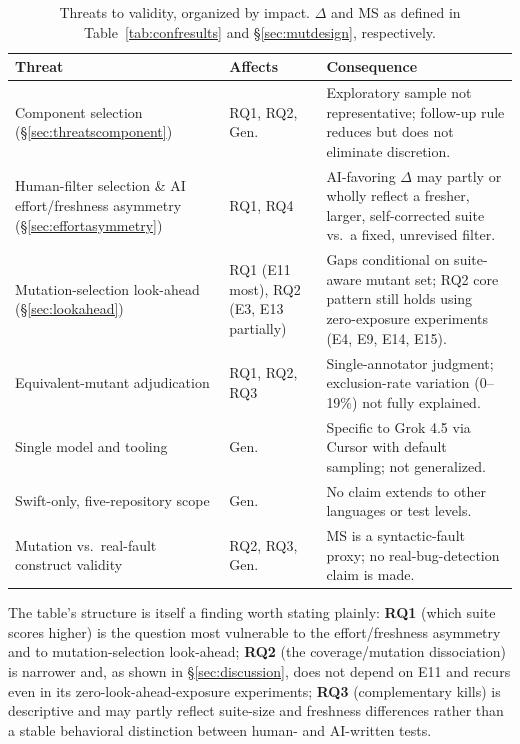 \documentclass[10pt,conference]{IEEEtran}
\begin{document}
\begin{table}[ht]
\centering
\caption{Threats to validity, organized by impact. $\Delta$ and MS as defined in Table~\ref{tab:confresults} and \S\ref{sec:mutdesign}, respectively.}
\label{tab:threatsimpact}
\small
\begin{tabular}{p{2.3cm}p{1.3cm}p{3.6cm}}
\toprule
Threat & Affects & Consequence \\
\midrule
Component selection (\S\ref{sec:threatscomponent}) & RQ1, RQ2, Gen. & Exploratory sample not representative; follow-up rule reduces but does not eliminate discretion. \\
Human-filter selection \& AI effort/freshness asymmetry (\S\ref{sec:effortasymmetry}) & RQ1, RQ4 & AI-favoring $\Delta$ may partly or wholly reflect a fresher, larger, self-corrected suite vs.\ a fixed, unrevised filter. \\
Mutation-selection look-ahead (\S\ref{sec:lookahead}) & RQ1 (E11 most), RQ2 (E3, E13 partially) & Gaps conditional on suite-aware mutant set; RQ2 core pattern still holds using zero-exposure experiments (E4, E9, E14, E15). \\
Equivalent-mutant adjudication & RQ1, RQ2, RQ3 & Single-annotator judgment; exclusion-rate variation (0--19\%) not fully explained. \\
Single model and tooling & Gen. & Specific to Grok 4.5 via Cursor with default sampling; not generalized. \\
Swift-only, five-repository scope & Gen. & No claim extends to other languages or test levels. \\
Mutation vs.\ real-fault construct validity & RQ2, RQ3, Gen. & MS is a syntactic-fault proxy; no real-bug-detection claim is made. \\
\bottomrule
\end{tabular}
\end{table}

The table's structure is itself a finding worth stating plainly: \textbf{RQ1} (which suite scores higher) is the question most vulnerable to the effort/freshness asymmetry and to mutation-selection look-ahead; \textbf{RQ2} (the coverage/mutation dissociation) is narrower and, as shown in \S\ref{sec:discussion}, does not depend on E11 and recurs even in its zero-look-ahead-exposure experiments; \textbf{RQ3} (complementary kills) is descriptive and may partly reflect suite-size and freshness differences rather than a stable behavioral distinction between human- and AI-written tests.
\end{document}
